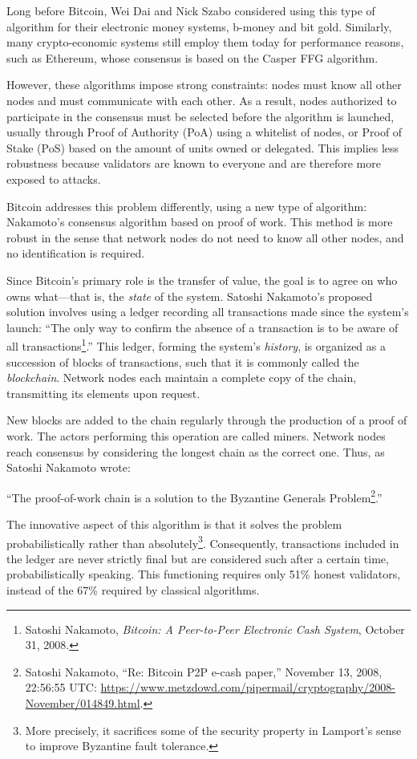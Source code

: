 \documentclass[
  a5paper,
  smalldemyvopaper,10pt,twoside,onecolumn,openright,extrafontsizes,hidelinks]{memoir}
\begin{document}
Long before Bitcoin, Wei Dai and Nick Szabo considered using this type
of algorithm for their electronic money systems, b-money and bit gold.
Similarly, many crypto-economic systems still employ them today for
performance reasons, such as Ethereum, whose consensus is based on the
Casper FFG algorithm.

However, these algorithms impose strong constraints: nodes must know all
other nodes and must communicate with each other. As a result, nodes
authorized to participate in the consensus must be selected before the
algorithm is launched, usually through Proof of Authority (PoA) using a
whitelist of nodes, or Proof of Stake (PoS) based on the amount of units
owned or delegated. This implies less robustness because validators are
known to everyone and are therefore more exposed to attacks.

Bitcoin addresses this problem differently, using a new type of
algorithm: Nakamoto's consensus algorithm based on proof of work. This
method is more robust in the sense that network nodes do not need to
know all other nodes, and no identification is required.

Since Bitcoin's primary role is the transfer of value, the goal is to
agree on who owns what---that is, the \emph{state} of the system.
Satoshi Nakamoto's proposed solution involves using a ledger recording
all transactions made since the system's launch: ``The only way to
confirm the absence of a transaction is to be aware of all
transactions\footnote{Satoshi Nakamoto, \emph{Bitcoin: A Peer-to-Peer
  Electronic Cash System}, October 31, 2008.}.'' This ledger, forming
the system's \emph{history}, is organized as a succession of blocks of
transactions, such that it is commonly called the \emph{blockchain}.
Network nodes each maintain a complete copy of the chain, transmitting
its elements upon request.

New blocks are added to the chain regularly through the production of a
proof of work. The actors performing this operation are called miners.
Network nodes reach consensus by considering the longest chain as the
correct one. Thus, as Satoshi Nakamoto wrote:

``The proof-of-work chain is a solution to the Byzantine Generals
Problem\footnote{Satoshi Nakamoto, ``Re: Bitcoin P2P e-cash paper,''
  November 13, 2008, 22:56:55 UTC:
  \url{https://www.metzdowd.com/pipermail/cryptography/2008-November/014849.html}.}.''

The innovative aspect of this algorithm is that it solves the problem
probabilistically rather than absolutely\footnote{More precisely, it
  sacrifices some of the security property in Lamport's sense to improve
  Byzantine fault tolerance.}. Consequently, transactions included in
the ledger are never strictly final but are considered such after a
certain time, probabilistically speaking. This functioning requires only
51\% honest validators, instead of the 67\% required by classical
algorithms.
\end{document}
